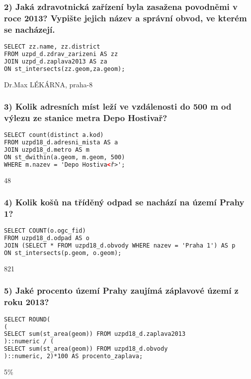 \documentclass[a4paper, 12pt]{article}
\begin{document}
\subsubsection*{2) Jaká zdravotnická zařízení byla zasažena povodněmi v roce 2013? Vypište jejich název a správní obvod, ve kterém se nacházejí.}
\begin{lstlisting}[language=html]
SELECT zz.name, zz.district 
FROM uzpd_d.zdrav_zarizeni AS zz
JOIN uzpd_d.zaplava2013 AS za 
ON st_intersects(zz.geom,za.geom);
\end{lstlisting}
Dr.Max LÉKÁRNA, praha-8
\vspace{0.8cm}

\subsubsection*{3) Kolik adresních míst leží ve vzdálenosti do 500 m od výlezu ze stanice metra Depo Hostivař?}
\begin{lstlisting}[language=html]
SELECT count(distinct a.kod) 
FROM uzpd18_d.adresni_mista AS a
JOIN uzpd18_d.metro AS m
ON st_dwithin(a.geom, m.geom, 500)
WHERE m.nazev = 'Depo Hostiva<ř>';
\end{lstlisting}
48
\vspace{0.8cm}

\subsubsection*{4) Kolik košů na tříděný odpad se nachází na území Prahy 1?}
\begin{lstlisting}[language=html]
SELECT COUNT(o.ogc_fid) 
FROM uzpd18_d.odpad AS o
JOIN (SELECT * FROM uzpd18_d.obvody WHERE nazev = 'Praha 1') AS p
ON st_intersects(p.geom, o.geom);
\end{lstlisting}
821
\vspace{0.8cm}

\subsubsection*{5) Jaké procento území Prahy zaujímá záplavové území z roku 2013?}
\begin{lstlisting}[language=html]
SELECT ROUND(
(
SELECT sum(st_area(geom)) FROM uzpd18_d.zaplava2013
)::numeric / (
SELECT sum(st_area(geom)) FROM uzpd18_d.obvody
)::numeric, 2)*100 AS procento_zaplava;
\end{lstlisting}
5\%
\vspace{0.8cm}
\end{document}
